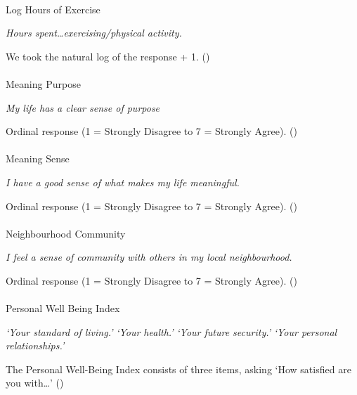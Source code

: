 \documentclass[
  single column]{article}
\makeatletter
\let\oldparagraph\paragraph
\renewcommand{\paragraph}{
    \@ifstar
      \xxxParagraphStar
      \xxxParagraphNoStar
  }
\newcommand{\xxxParagraphStar}[1]{\oldparagraph*{#1}\mbox{}}
\newcommand{\xxxParagraphNoStar}[1]{\oldparagraph{#1}\mbox{}}
\makeatother
\begin{document}
\paragraph{Log Hours of Exercise}\label{log-hours-of-exercise-1}

\emph{Hours spent\ldots exercising/physical activity.}

We took the natural log of the response + 1.
()

\paragraph{Meaning Purpose}\label{meaning-purpose}

\emph{My life has a clear sense of purpose}

Ordinal response (1 = Strongly Disagree to 7 = Strongly Agree).
()

\paragraph{Meaning Sense}\label{meaning-sense}

\emph{I have a good sense of what makes my life meaningful.}

Ordinal response (1 = Strongly Disagree to 7 = Strongly Agree).
()

\paragraph{Neighbourhood Community}\label{neighbourhood-community}

\emph{I feel a sense of community with others in my local
neighbourhood.}

Ordinal response (1 = Strongly Disagree to 7 = Strongly Agree).
()

\paragraph{Personal Well Being Index}\label{personal-well-being-index}

\emph{`Your standard of living.'} \emph{`Your health.'} \emph{`Your
future security.'} \emph{`Your personal relationships.'}

The Personal Well-Being Index consists of three items, asking `How
satisfied are you with\ldots{}'
()
\end{document}
